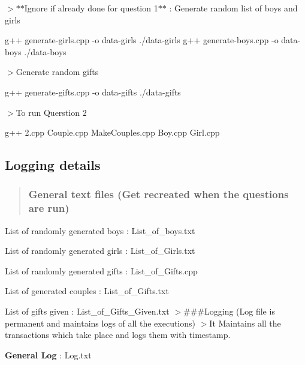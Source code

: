 $>$$\ast$$\ast$\+Ignore if already done for question 1$\ast$$\ast$ \+: Generate random list of boys and girls 
\begin{DoxyCode}
g++ generate-girls.cpp -o data-girls
./data-girls
g++ generate-boys.cpp -o data-boys
./data-boys
\end{DoxyCode}
 $>$Generate random gifts 
\begin{DoxyCode}
g++ generate-gifts.cpp -o data-gifts
./data-gifts
\end{DoxyCode}
 $>$To run Querstion 2 
\begin{DoxyCode}
g++ 2.cpp Couple.cpp MakeCouples.cpp Boy.cpp Girl.cpp
\end{DoxyCode}


\subsection*{Logging details}

\begin{quote}
\subsubsection*{General text files (Get recreated when the questions are run)}

\end{quote}

\begin{DoxyItemize}
\item List of randomly generated boys \+: List\+\_\+of\+\_\+boys.\+txt
\item List of randomly generated girls \+: List\+\_\+of\+\_\+\+Girls.\+txt
\item List of randomly generated gifts \+: List\+\_\+of\+\_\+\+Gifts.\+cpp
\item List of generated couples \+: List\+\_\+of\+\_\+\+Gifts.\+txt
\item List of gifts given \+: List\+\_\+of\+\_\+\+Gifts\+\_\+\+Given.\+txt $>$\#\#\#\+Logging (Log file is permanent and maintains logs of all the executions) $>$It Maintains all the transactions which take place and logs them with timestamp.
\end{DoxyItemize}

{\bfseries General Log} \+: Log.\+txt 